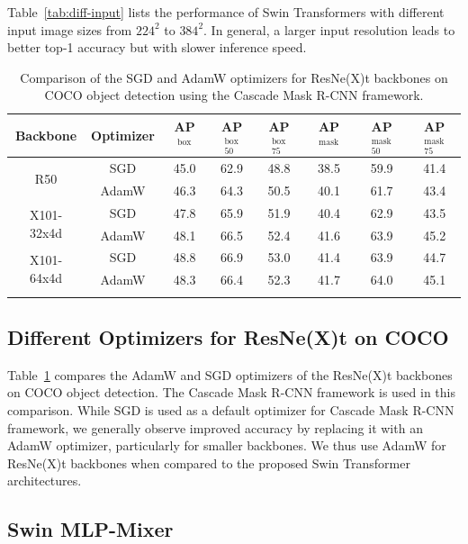 \documentclass[10pt,twocolumn,letterpaper]{article}
\begin{document}
Table~\ref{tab:diff-input} lists the performance of Swin Transformers with different input image sizes from $224^2$ to $384^2$. In general, a larger input resolution leads to better top-1 accuracy but with slower inference speed.

\begin{table}[]
    \centering
    \small
\addtolength{\tabcolsep}{-4.8pt}
\begin{tabular}{cc|ccc|ccc}
\Xhline{1.0pt}
Backbone& Optimizer & AP$^\text{box}$ & AP$^\text{box}_\text{50}$ & AP$^\text{box}_\text{75}$ & AP$^\text{mask}$ & AP$^\text{mask}_\text{50}$ & AP$^\text{mask}_\text{75}$ \\
\hline
\multirow{2}{*}{R50} & SGD & 45.0 & 62.9 & 48.8 & 38.5 & 59.9 & 41.4 \\
& AdamW & 46.3 & 64.3 & 50.5 & 40.1 & 61.7 & 43.4 \\
\hline
\multirow{2}{*}{X101-32x4d} & SGD & 47.8 & 65.9 & 51.9 & 40.4 & 62.9 & 43.5 \\
& AdamW & 48.1 & 66.5 & 52.4 & 41.6 & 63.9 & 45.2 \\
\hline
\multirow{2}{*}{X101-64x4d} & SGD & 48.8 & 66.9 & 53.0 & 41.4 & 63.9 & 44.7 \\
& AdamW & 48.3 & 66.4 & 52.3 & 41.7 & 64.0 & 45.1 \\
\Xhline{1.0pt}
\end{tabular}
    \caption{Comparison of the SGD and AdamW optimizers for ResNe(X)t backbones on COCO object detection using the Cascade Mask R-CNN framework.}
    \label{tab:app-optimizer}
    \normalsize
\end{table}

\subsection{Different Optimizers for ResNe(X)t on COCO} 

Table~\ref{tab:app-optimizer} compares the AdamW and SGD optimizers of the ResNe(X)t backbones on COCO object detection. The Cascade Mask R-CNN framework is used in this comparison. While SGD is used as a default optimizer for Cascade Mask R-CNN framework, we generally observe improved accuracy by replacing it with an AdamW optimizer, particularly for smaller backbones. We thus use AdamW for ResNe(X)t backbones when compared to the proposed Swin Transformer architectures.

\subsection{Swin MLP-Mixer}
\end{document}
